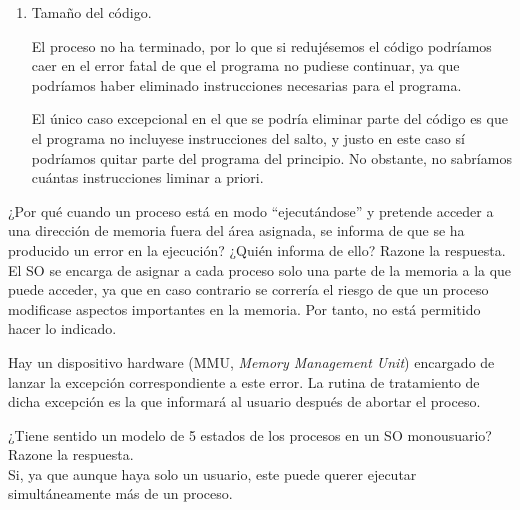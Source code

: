 \begin{ejercicio}
\begin{enumerate}[label=(\alph*)]
      \item Tamaño del código.

      El proceso no ha terminado, por lo que si redujésemos el código podríamos caer en el error fatal de que el programa no pudiese continuar, ya que podríamos haber eliminado instrucciones necesarias para el programa.

      El único caso excepcional en el que se podría eliminar parte del código es que el programa no incluyese instrucciones del salto, y justo en este caso sí podríamos quitar parte del programa del principio. No obstante, no sabríamos cuántas instrucciones liminar a priori.
    \end{enumerate}
    
\end{ejercicio}

\begin{ejercicio} \label{ej:2.Ejercicio2}
    ¿Por qué cuando un proceso está en modo “ejecutándose” y pretende acceder a una dirección de memoria fuera del área asignada, se informa de que se ha producido un error en la ejecución? ¿Quién informa de ello? Razone la respuesta.\\

    El SO se encarga de asignar a cada proceso solo una parte de la memoria a la que puede acceder, ya que en caso contrario se correría el riesgo de que un proceso modificase aspectos importantes en la memoria. Por tanto, no está permitido hacer lo indicado.
    
    Hay un dispositivo hardware (MMU, \emph{Memory Management Unit}) encargado de lanzar la excepción correspondiente a este error. La rutina de tratamiento de dicha excepción es la que informará al usuario después de abortar el proceso.
\end{ejercicio}

\begin{ejercicio}\label{ej:2.Ejercicio3}
    ¿Tiene sentido un modelo de 5 estados de los procesos en un SO monousuario? Razone la respuesta.\\

    Si, ya que aunque haya solo un usuario, este puede querer ejecutar simultáneamente más de un proceso.
\end{ejercicio}

